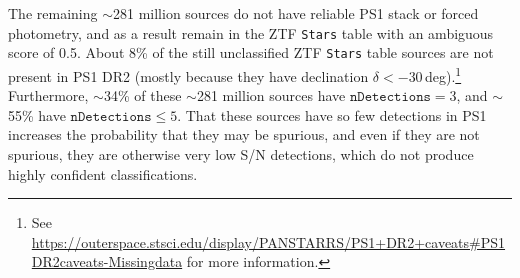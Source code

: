 \documentclass[twocolumn]{aastex63}
\begin{document}
The remaining $\sim$281 million sources do not have reliable PS1 stack or
forced photometry, and as a result remain in the ZTF \texttt{Stars} table with
an ambiguous score of 0.5. About 8\% of the still unclassified ZTF
\texttt{Stars} table sources are not present in PS1 DR2 (mostly because they
have declination $\delta < -30$\,deg).\footnote{See
\url{https://outerspace.stsci.edu/display/PANSTARRS/PS1+DR2+caveats\#PS1DR2caveats-Missingdata} for more information.} Furthermore, $\sim$34\% of these
$\sim$281 million sources have $\mathtt{nDetections} = 3$, and $\sim$55\% have
$\mathtt{nDetections} \le 5$. That these sources have so few detections in PS1
increases the probability that they may be spurious, and even if they are not
spurious, they are otherwise very low S/N detections, which do not produce
highly confident classifications.




\end{document}

